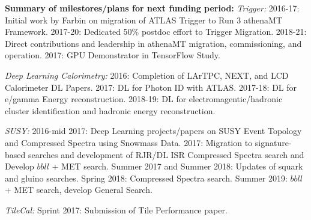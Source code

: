 {\bf Summary of milestores/plans for next funding period:} {\em Trigger:}
2016-17: Initial work by Farbin on migration of ATLAS Trigger to Run 3
athenaMT Framework.  2017-20: Dedicated 50\% postdoc effort to Trigger
Migration. 2018-21: Direct contributions and leadership in athenaMT
migration, commissioning, and operation.  2017: GPU Demonstrator in
TensorFlow Study.

{\em Deep Learning Calorimetry:} 2016: Completion of LArTPC, NEXT, and LCD
Calorimeter DL Papers. 2017: DL for Photon ID with ATLAS. 2017-18: DL
for e/gamma Energy reconstruction. 2018-19: DL for
electromagentic/hadronic cluster identification and hadronic energy
reconstruction.



{\em SUSY:} 2016-mid 2017: Deep Learning projects/papers on SUSY Event
Topology and Compressed Spectra using Snowmass Data. 2017: Migration
to signature-based searches and development of RJR/DL ISR Compressed
Spectra search and Develop $bbll$ + MET search.  Summer 2017 and
Summer 2018: Updates of squark and gluino searches. Spring 2018:
Compressed Spectra search. Summer 2019: $bbll$ + MET search, develop
General Search.

{\em TileCal:} Sprint 2017: Submission of Tile Performance paper.
